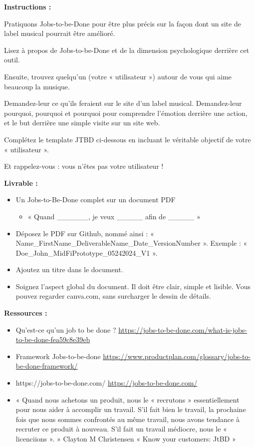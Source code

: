 \makeheaderfiles

\textbf{Instructions :}

Pratiquons Jobs-to-be-Done pour être plus précis sur la façon dont un site de label musical pourrait être amélioré.

Lisez à propos de Jobs-to-be-Done et de la dimension psychologique derrière cet outil.

Ensuite, trouvez quelqu'un (votre « utilisateur ») autour de vous qui aime beaucoup la musique.

Demandez-leur ce qu'ils feraient sur le site d'un label musical. Demandez-leur pourquoi, pourquoi et pourquoi pour comprendre l'émotion derrière une action, et le but derrière une simple visite sur un site web.

Complétez le template JTBD ci-dessous en incluant le véritable objectif de votre « utilisateur ».

Et rappelez-vous : vous n'êtes pas votre utilisateur !

\textbf{Livrable :}

\begin{itemize}
\item Un Jobs-to-Be-Done complet sur un document PDF
\begin{itemize}
\item « Quand \_\_\_\_\_\_, je veux \_\_\_\_\_ afin de \_\_\_\_\_ »
\end{itemize}
\item Déposez le PDF sur Github, nommé ainsi : « Name\_FirstName\_DeliverableName\_Date\_VersionNumber ». Exemple : « Doe\_John\_MidFiPrototype\_05242024\_V1 ».
\item Ajoutez un titre dans le document.
\item Soignez l'aspect global du document. Il doit être clair, simple et lisible. Vous pouvez regarder canva.com, sans surcharger le dessin de détails.
\end{itemize}

\textbf{Ressources :}

\begin{itemize}
\item Qu'est-ce qu'un job to be done ? \url{https://jobs-to-be-done.com/what-is-jobs-to-be-done-fea59c8e39eb}
\item Framework Jobs-to-be-done \url{https://www.productplan.com/glossary/jobs-to-be-done-framework/}
\item https://jobs-to-be-done.com/ \url{https://jobs-to-be-done.com/}
\item « Quand nous achetons un produit, nous le « recrutons » essentiellement pour nous aider à accomplir un travail. S'il fait bien le travail, la prochaine fois que nous sommes confrontés au même travail, nous avons tendance à recruter ce produit à nouveau. S'il fait un travail médiocre, nous le « licenciions ». » Clayton M Christensen « Know your customers: JtBD »
\end{itemize}

